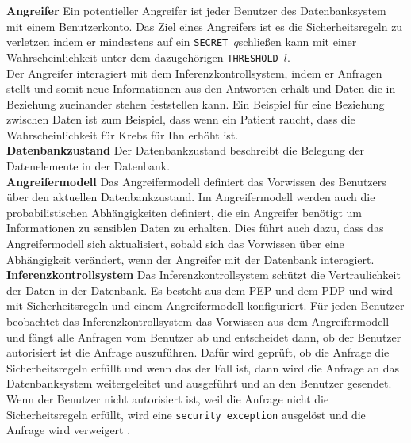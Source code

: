 \documentclass[german,version-2020-11]{uzl-thesis}
\begin{document}
\textbf{Angreifer} Ein potentieller Angreifer ist jeder Benutzer des Datenbanksystem mit einem Benutzerkonto. Das Ziel eines Angreifers ist es die Sicherheitsregeln zu verletzen indem er mindestens auf ein \texttt{SECRET $q$}schließen kann mit einer Wahrscheinlichkeit unter dem dazugehörigen \texttt{THRESHOLD $l$}. \\ Der Angreifer interagiert mit dem Inferenzkontrollsystem, indem er Anfragen stellt und somit neue Informationen aus den Antworten erhält und Daten die in Beziehung zueinander stehen feststellen kann. Ein Beispiel für eine Beziehung zwischen Daten ist zum Beispiel, dass wenn ein Patient raucht, dass die Wahrscheinlichkeit für Krebs für Ihn erhöht ist.  \\
\textbf{Datenbankzustand} Der Datenbankzustand beschreibt die Belegung der Datenelemente in der Datenbank. \\
\textbf{Angreifermodell} Das Angreifermodell definiert das Vorwissen des Benutzers über den aktuellen Datenbankzustand. Im Angreifermodell werden auch die probabilistischen Abhängigkeiten definiert, die ein Angreifer benötigt um Informationen zu sensiblen Daten zu erhalten. Dies führt auch dazu, dass das Angreifermodell sich aktualisiert, sobald sich das Vorwissen über eine Abhängigkeit verändert, wenn der Angreifer mit der Datenbank interagiert.\\ 
\textbf{Inferenzkontrollsystem} Das Inferenzkontrollsystem schützt die Vertraulichkeit der Daten in der Datenbank. Es besteht aus dem PEP und dem PDP und wird mit Sicherheitsregeln und einem Angreifermodell konfiguriert. Für jeden Benutzer beobachtet das Inferenzkontrollsystem das Vorwissen aus dem Angreifermodell und fängt alle Anfragen vom Benutzer ab und entscheidet dann, ob der Benutzer autorisiert ist die Anfrage auszuführen. Dafür wird geprüft, ob die Anfrage die Sicherheitsregeln erfüllt und wenn das der Fall ist, dann wird die Anfrage an das Datenbanksystem weitergeleitet und ausgeführt und an den Benutzer gesendet. Wenn der Benutzer nicht autorisiert ist, weil die Anfrage nicht die Sicherheitsregeln erfüllt, wird eine \texttt{security exception} ausgelöst und die Anfrage wird verweigert \cite{6}.
\end{document}
